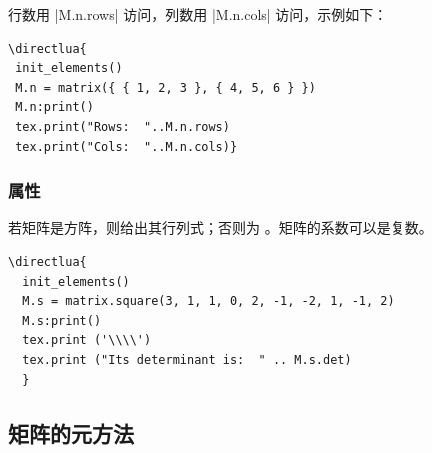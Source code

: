 行数用 |M.n.rows| 访问，列数用 |M.n.cols| 访问，示例如下：

\vspace{.5em}
\begin{minipage}{.5\textwidth}
\begin{verbatim}
\directlua{
 init_elements()
 M.n = matrix({ { 1, 2, 3 }, { 4, 5, 6 } })
 M.n:print()
 tex.print("Rows:  "..M.n.rows)
 tex.print("Cols:  "..M.n.cols)}
\end{verbatim}
\end{minipage}
\begin{minipage}{.5\textwidth}
\end{minipage}

\subsubsection{属性  }
\label{ssub:attributes_matrix_det}
若矩阵是方阵，则给出其行列式；否则为 。矩阵的系数可以是复数。

\vspace{.5em}
\begin{minipage}{.6\textwidth}
\begin{verbatim}
\directlua{
  init_elements()
  M.s = matrix.square(3, 1, 1, 0, 2, -1, -2, 1, -1, 2)
  M.s:print()
  tex.print ('\\\\')
  tex.print ("Its determinant is:  " .. M.s.det)
  }
\end{verbatim}
\end{minipage}
\begin{minipage}{.4\textwidth}
\end{minipage}

\subsection{矩阵的元方法}

